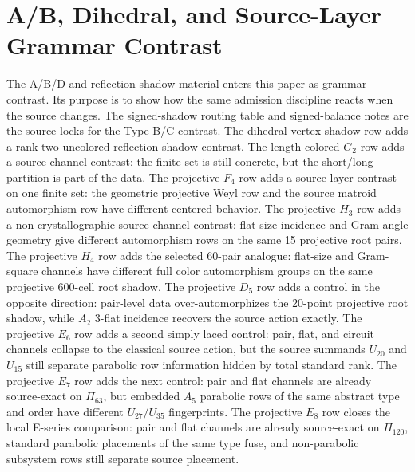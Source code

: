 \section{A/B, Dihedral, and Source-Layer Grammar Contrast}

The A/B/D and reflection-shadow material enters this paper as grammar contrast.  Its purpose is to show how the same admission discipline reacts when the source changes.  The signed-shadow routing table and signed-balance notes are the source locks for the Type-B/C contrast.  The dihedral vertex-shadow row adds a rank-two uncolored reflection-shadow contrast.  The length-colored \(G_2\) row adds a source-channel contrast: the finite set is still concrete, but the short/long partition is part of the data.  The projective \(F_4\) row adds a source-layer contrast on one finite set: the geometric projective Weyl row and the source matroid automorphism row have different centered behavior.  The projective \(H_3\) row adds a non-crystallographic source-channel contrast: flat-size incidence and Gram-angle geometry give different automorphism rows on the same 15 projective root pairs.  The projective \(H_4\) row adds the selected 60-pair analogue: flat-size and Gram-square channels have different full color automorphism groups on the same projective 600-cell root shadow.  The projective \(D_5\) row adds a control in the opposite direction: pair-level data over-automorphizes the 20-point projective root shadow, while \(A_2\) 3-flat incidence recovers the source action exactly.  The projective \(E_6\) row adds a second simply laced control: pair, flat, and circuit channels collapse to the classical source action, but the source summands \(U_{20}\) and \(U_{15}\) still separate parabolic row information hidden by total standard rank.  The projective \(E_7\) row adds the next control: pair and flat channels are already source-exact on \(\Pi_{63}\), but embedded \(A_5\) parabolic rows of the same abstract type and order have different \(U_{27}/U_{35}\) fingerprints.  The projective \(E_8\) row closes the local E-series comparison: pair and flat channels are already source-exact on \(\Pi_{120}\), standard parabolic placements of the same type fuse, and non-parabolic subsystem rows still separate source placement.

